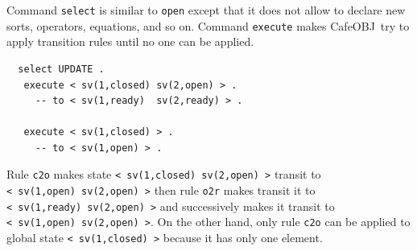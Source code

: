 \documentclass[12pt]{report}
\newcommand{\stt}[1]{{\small{\tt {#1}}}}
\newcommand{\cafeobj}{{\sf CafeOBJ}~}
\begin{document}
Command {\tt select} is similar to {\tt open} except that it does not
allow to declare new sorts, operators, equations, and so on. 
Command {\tt execute} makes \cafeobj try to apply transition
rules until no one can be applied.
\small
\begin{verbatim}
  select UPDATE .
   execute < sv(1,closed) sv(2,open) > .
     -- to < sv(1,ready)  sv(2,ready) > .

   execute < sv(1,closed) > .
     -- to < sv(1,open) > .
\end{verbatim}
\normalsize
Rule {\tt c2o} makes state \stt{<~sv(1,closed)~sv(2,open)~>} transit
to \stt{<~sv(1,open)~sv(2,open)~>} then rule {\tt o2r} makes transit
it to \stt{<~sv(1,ready)~sv(2,open)~>} and successively makes it
transit to \stt{<~sv(1,open)~sv(2,open)~>}. On the other hand,
only rule {\tt c2o} can be applied to global state \stt{<~sv(1,closed)~>}
because it has only one element.

\end{document}
